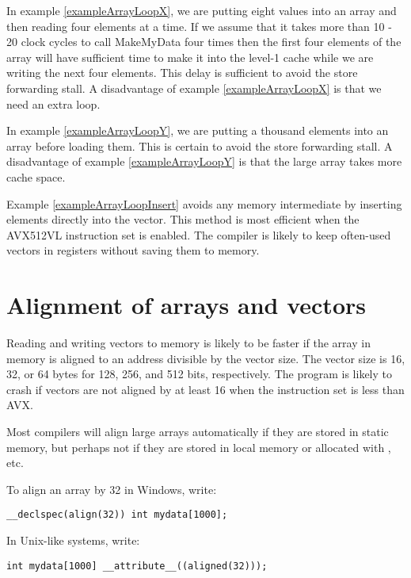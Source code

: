 \documentclass[vcl_manual.tex]{subfiles}
\begin{document}
In example \ref{exampleArrayLoopX}, we are putting eight values into an array and then reading four elements at a time. If we assume that it takes more than 10 - 20 clock cycles to call MakeMyData four times then the first four elements of the array will have sufficient time to make it into the level-1 cache while we are writing the next four elements. This delay is sufficient to avoid the store forwarding stall. A disadvantage of example \ref{exampleArrayLoopX} is that we need an extra loop.

In example \ref{exampleArrayLoopY}, we are putting a thousand elements into an array before loading them. This is certain to avoid the store forwarding stall. A disadvantage of example \ref{exampleArrayLoopY} is that the large array takes more cache space.

Example \ref{exampleArrayLoopInsert} avoids any memory intermediate by inserting elements directly into the vector. This method is most efficient when the AVX512VL instruction set is enabled. The compiler is likely to keep often-used vectors in registers without saving them to memory.


\section{Alignment of arrays and vectors}\label{Alignment}

Reading and writing vectors to memory is likely to be faster if the array in memory is aligned to an address divisible by the vector size. The vector size is 16, 32, or 64 bytes for 128, 256, and 512 bits, respectively. The program is likely to crash if vectors are not aligned by at least 16 when the instruction set is less than AVX.

Most compilers will align large arrays automatically if they are stored in static memory, but perhaps not if they are stored in local memory or allocated with , etc.


To align an array by 32 in Windows, write:
\begin{lstlisting}[frame=none]
__declspec(align(32)) int mydata[1000];
\end{lstlisting}

In Unix-like systems, write:

\begin{lstlisting}[frame=none]
int mydata[1000] __attribute__((aligned(32)));
\end{lstlisting}
\end{document}

